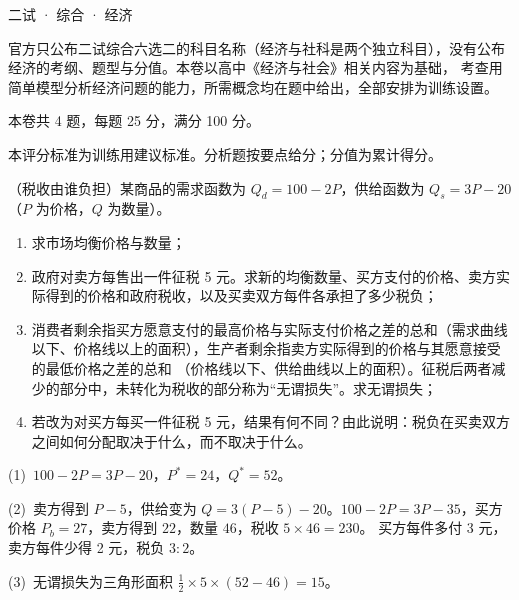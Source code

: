 \documentclass[cjk=noto, seal=first]{mojing-exam}
\begin{document}
\begin{paper}[time={建议 1.5 小时（训练设置）}, full=100]{二试 · 综合 · 经济}

\begin{instructions}
  \item 官方只公布二试综合六选二的科目名称（经济与社科是两个独立科目），没有公布经济的考纲、题型与分值。本卷以高中《经济与社会》相关内容为基础，
        考查用简单模型分析经济问题的能力，所需概念均在题中给出，全部安排为训练设置。
  \item 本卷共 4 题，每题 25 分，满分 100 分。
\end{instructions}

\begin{gradingnotes}
  \item 本评分标准为训练用建议标准。分析题按要点给分；分值为累计得分。
\end{gradingnotes}


\begin{questions}

\question[25]
（税收由谁负担）某商品的需求函数为 $Q_d=100-2P$，供给函数为 $Q_s=3P-20$（$P$ 为价格，$Q$ 为数量）。
\begin{enumerate}
  \item 求市场均衡价格与数量；
  \item 政府对卖方每售出一件征税 5 元。求新的均衡数量、买方支付的价格、卖方实际得到的价格和政府税收，以及买卖双方每件各承担了多少税负；
  \item 消费者剩余指买方愿意支付的最高价格与实际支付价格之差的总和（需求曲线以下、价格线以上的面积），生产者剩余指卖方实际得到的价格与其愿意接受的最低价格之差的总和
        （价格线以下、供给曲线以上的面积）。征税后两者减少的部分中，未转化为税收的部分称为“无谓损失”。求无谓损失；
  \item 若改为对买方每买一件征税 5 元，结果有何不同？由此说明：税负在买卖双方之间如何分配取决于什么，而不取决于什么。
\end{enumerate}
\answerspace{2cm}
\begin{solution}
(1)~$100-2P=3P-20$，$P^*=24$，$Q^*=52$。

(2)~卖方得到 $P-5$，供给变为 $Q=3(P-5)-20$。$100-2P=3P-35$，买方价格 $P_b=27$，卖方得到 $22$，数量 $46$，税收 $5\times46=230$。
买方每件多付 3 元，卖方每件少得 2 元，税负 $3:2$。

(3)~无谓损失为三角形面积 $\frac12\times5\times(52-46)=15$。


\end{solution}
\end{questions}
\end{paper}
\end{document}
